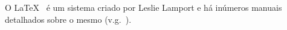 \documentclass[a4paper,11pt,oneside,onecolumn]{report}
\begin{document}
O {\LaTeX}~\cite{Lamport.94} é um sistema criado por Leslie Lamport e há inúmeros manuais detalhados sobre o mesmo (v.g.~\cite{Kopka.03}).

\printbibliography[type=article,title={Articles only}]
\end{document}
